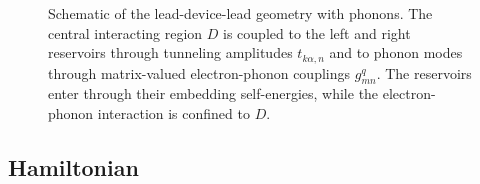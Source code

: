 \documentclass[
 reprint,
 superscriptaddress,
 amsmath,amssymb,
 aps,prb,
 longbibliography,
 floatfix
]{revtex4-2}
\begin{document}
\begin{figure}[ht]
{%
}
\caption{
Schematic of the lead-device-lead geometry with phonons. The central interacting region $D$
is coupled to the left and right reservoirs through tunneling amplitudes
$t_{k\alpha,n}$ and to phonon modes through matrix-valued
electron-phonon couplings $g_{mn}^{q}$. The reservoirs enter through their
embedding self-energies, while the electron-phonon interaction is confined
to $D$.
}
\label{fig:ldl-schematic}
\end{figure}


\subsection{Hamiltonian}
\end{document}
